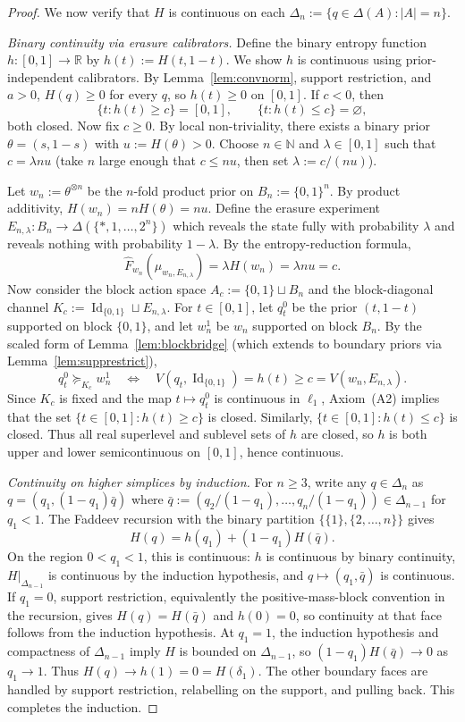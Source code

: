 \documentclass[11pt,a4paper]{article}
\theoremstyle{definition}
\newcommand{\R}{\mathbb R}
\newcommand{\Id}{\operatorname{Id}}
\newcommand{\1}{\mathbf 1}
\begin{document}
\begin{proof}
We now verify that $H$ is continuous on each $\Delta_n:=\{q\in\Delta(A):|A|=n\}$.

\emph{Binary continuity via erasure calibrators.}
Define the binary entropy function $h:[0,1]\to\R$ by $h(t):=H(t,1-t)$.  We show $h$ is continuous using
prior-independent calibrators.  By Lemma~\ref{lem:convnorm}, support restriction, and $a>0$, $H(q)\ge0$ for every $q$,
so $h(t)\ge0$ on $[0,1]$.  If $c<0$, then
\[
\{t:h(t)\ge c\}=[0,1],
\qquad
\{t:h(t)\le c\}=\varnothing,
\]
both closed.  Now fix $c\ge0$.  By local non-triviality, there exists a binary prior $\theta=(s,1-s)$ with
$u:=H(\theta)>0$.  Choose $n\in\mathbb{N}$ and $\lambda\in[0,1]$ such that $c=\lambda nu$
(take $n$ large enough that $c\le nu$, then set $\lambda:=c/(nu)$).

Let $w_n:=\theta^{\otimes n}$ be the $n$-fold product prior on $B_n:=\{0,1\}^n$.  By product additivity,
$H(w_n)=nH(\theta)=nu$.  Define the erasure experiment $E_{n,\lambda}:B_n\to\Delta(\{*,1,\dots,2^n\})$ which
reveals the state fully with probability $\lambda$ and reveals nothing with probability $1-\lambda$.  By the
entropy-reduction formula,
\[
\widehat F_{w_n}(\mu_{w_n,E_{n,\lambda}})=\lambda H(w_n)=\lambda nu=c.
\]
Now consider the block action space $A_c:=\{0,1\}\sqcup B_n$ and the block-diagonal channel
$K_c:=\Id_{\{0,1\}}\sqcup E_{n,\lambda}$.  For $t\in[0,1]$, let $q_t^0$ be the prior $(t,1-t)$ supported on
block $\{0,1\}$, and let $w_n^1$ be $w_n$ supported on block $B_n$.  By the scaled form of
Lemma~\ref{lem:blockbridge} (which extends to boundary priors via Lemma~\ref{lem:supprestrict}),
\[
q_t^0\succeq_{K_c}w_n^1\quad\Longleftrightarrow\quad V(q_t,\Id_{\{0,1\}})=h(t)\ge c=V(w_n,E_{n,\lambda}).
\]
Since $K_c$ is fixed and the map $t\mapsto q_t^0$ is continuous in $\ell_1$, Axiom~\textup{(A2)} implies that the
set $\{t\in[0,1]:h(t)\ge c\}$ is closed.  Similarly, $\{t\in[0,1]:h(t)\le c\}$ is closed.  Thus all real superlevel and
sublevel sets of $h$ are closed, so $h$ is both upper and lower semicontinuous on $[0,1]$, hence continuous.

\emph{Continuity on higher simplices by induction.}
For $n\ge3$, write any $q\in\Delta_n$ as $q=(q_1,(1-q_1)\bar q)$ where
$\bar q:=(q_2/(1-q_1),\dots,q_n/(1-q_1))\in\Delta_{n-1}$ for $q_1<1$.  The Faddeev recursion with the
binary partition $\{\{1\},\{2,\dots,n\}\}$ gives
\[
H(q)=h(q_1)+(1-q_1)H(\bar q).
\]
On the region $0<q_1<1$, this is continuous: $h$ is continuous by binary continuity, $H|_{\Delta_{n-1}}$ is
continuous by the induction hypothesis, and $q\mapsto(q_1,\bar q)$ is continuous.  If $q_1=0$, support restriction,
equivalently the positive-mass-block convention in the recursion, gives $H(q)=H(\bar q)$ and $h(0)=0$,
so continuity at that face follows from the induction hypothesis.  At $q_1=1$, the induction hypothesis and compactness
of $\Delta_{n-1}$ imply $H$ is bounded on $\Delta_{n-1}$, so
$(1-q_1)H(\bar q)\to0$ as $q_1\to1$.  Thus $H(q)\to h(1)=0=H(\delta_1)$.  The other boundary faces are handled
by support restriction, relabelling on the support, and pulling back.  This completes the induction.


\end{proof}
\end{document}
